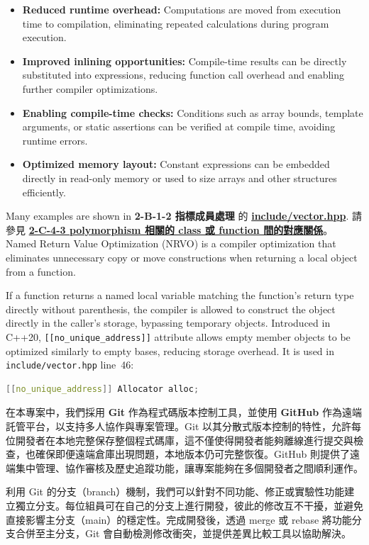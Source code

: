 \documentclass[a4paper,12pt]{article}
\begin{document}
\begin{itemize}
  \item \textbf{Reduced runtime overhead:} Computations are moved from execution time to compilation, eliminating repeated calculations during program execution.
  \item \textbf{Improved inlining opportunities:} Compile-time results can be directly substituted into expressions, reducing function call overhead and enabling further compiler optimizations.
  \item \textbf{Enabling compile-time checks:} Conditions such as array bounds, template arguments, or static assertions can be verified at compile time, avoiding runtime errors.
  \item \textbf{Optimized memory layout:} Constant expressions can be embedded directly in read-only memory or used to size arrays and other structures efficiently.
\end{itemize}
Many examples are shown in \textbf{2-B-1-2 指標成員處理} 的 \hyperref[vector-list]{\textbf{include/vector.hpp}}.
請參見 \hyperref[2-C-4-3]{\textbf{2-C-4-3 polymorphism 相關的 class 或 function 間的對應關係}}。
Named Return Value Optimization (NRVO) is a compiler optimization that eliminates unnecessary copy or move constructions when returning a local object from a function.

If a function returns a named local variable matching the function's return type directly without parenthesis, the compiler is allowed to construct the object directly in the caller's storage, bypassing temporary objects.
Introduced in C++20, \texttt{[[no\_unique\_address]]} attribute allows empty member objects to be optimized similarly to empty bases, reducing storage overhead. It is used in \verb|include/vector.hpp| line~46:
\begin{lstlisting}[language=C++]
  [[no_unique_address]] Allocator alloc;
\end{lstlisting}
在本專案中，我們採用 \textbf{Git} 作為程式碼版本控制工具，並使用 \textbf{GitHub} 作為遠端託管平台，以支持多人協作與專案管理。Git 以其分散式版本控制的特性，允許每位開發者在本地完整保存整個程式碼庫，這不僅使得開發者能夠離線進行提交與檢查，也確保即便遠端倉庫出現問題，本地版本仍可完整恢復。GitHub 則提供了遠端集中管理、協作審核及歷史追蹤功能，讓專案能夠在多個開發者之間順利運作。

利用 Git 的分支（branch）機制，我們可以針對不同功能、修正或實驗性功能建立獨立分支。每位組員可在自己的分支上進行開發，彼此的修改互不干擾，並避免直接影響主分支（main）的穩定性。完成開發後，透過 merge 或 rebase 將功能分支合併至主分支，Git 會自動檢測修改衝突，並提供差異比較工具以協助解決。
\end{document}
